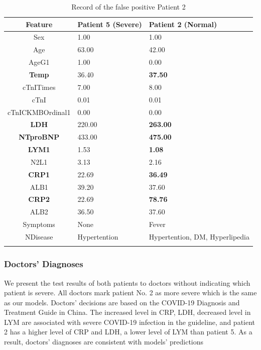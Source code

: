 \begin{table}[H]
\centering
\caption{Record of the false positive Patient 2}
\begin{tabular}{cp{2.2cm}p{2.1cm}}
\toprule
Feature   & Patient 5 (Severe) & Patient 2 (Normal)\\ 
\midrule
Sex                 &   1.00    &   1.00 \\
Age                 &   63.00   &   42.00 \\
AgeG1               &   1.00    &   0.00 \\
\textbf{Temp}       &   36.40   &   \textbf{37.50} \\
cTnITimes           &   7.00    &   8.00 \\
cTnI                &   0.01    &   0.01 \\
cTnICKMBOrdinal1    &  0.00     &   0.00 \\
\textbf{LDH}        &  220.00   &   \textbf{263.00} \\
\textbf{NTproBNP}   &  433.00   &   \textbf{475.00} \\
\textbf{LYM1}       &  1.53     &   \textbf{1.08} \\
N2L1                &  3.13     &   2.16 \\
\textbf{CRP1}       &  22.69    &   \textbf{36.49} \\
ALB1                &  39.20    &   37.60 \\
\textbf{CRP2}       &  22.69    &   \textbf{78.76} \\
ALB2                &  36.50    &   37.60 \\
Symptoms            &  None     &   Fever \\
NDisease            & Hypertention & Hypertention, DM, Hyperlipedia \\
\bottomrule
\label{tab:normal2}
\end{tabular}
\end{table}

\subsubsection{Doctors' Diagnoses}

We present the test results of both patients to doctors without indicating which patient is severe. All doctors mark patient No. 2 as more severe which is the same as our models. Doctors' decisions are based on the COVID-19 Diagnosis and Treatment Guide in China. The increased level in CRP, LDH, decreased level in LYM are associated with severe COVID-19 infection in the guideline, and patient 2 has a higher level of CRP and LDH, a lower level of LYM than patient 5. As a result, doctors' diagnoses are consistent with models' predictions

